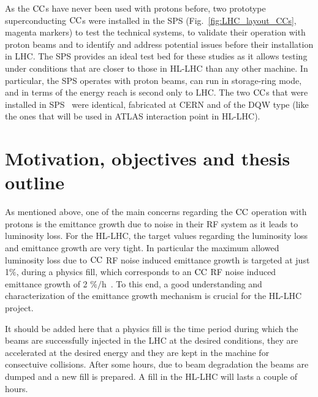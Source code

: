 
As the ${\mathrm{CC}}$s have never been used with protons before, two prototype superconducting ${\mathrm{CC}}$s were installed in the SPS (Fig.~\ref{fig:LHC_layout_CCs}, magenta markers) to test the technical systems, to validate their operation with proton beams and to identify and address potential issues before their installation in LHC. The SPS  provides an ideal test bed for these studies as it allows testing under conditions that are closer to those in HL-LHC than any other machine. In particular, the SPS operates with proton beams, can run in storage-ring mode, and in terms of the energy reach is second only to LHC. The two ${\mathrm{CC}}$s that were installed in SPS~\cite{Zanoni:2017} were identical, fabricated at CERN and of the DQW type (like the ones that will be used in ATLAS interaction point in HL-LHC).


\section{Motivation, objectives and thesis outline}\label{sec:motivation_outline}

As mentioned above, one of the main concerns regarding the ${\mathrm{CC}}$ operation with protons is the emittance growth due to noise in their RF system as it leads to luminosity loss. For the HL-LHC, the target values regarding the luminosity loss and emittance growth are very tight. In particular the maximum allowed luminosity loss due to ${\mathrm{CC}}$ RF noise induced emittance growth is targeted at just 1$\%$, during a physics fill, which corresponds to an ${\mathrm{CC}}$ RF noise induced emittance growth of 2 $\mathrm{\%/h}$~\cite{MedinaMedrano:2301928, CC_lumi_limits_philippe, CC_lumi_limits_ilias}. To this end, a good understanding and characterization of the emittance growth mechanism is crucial for the HL-LHC project.

It should be added here that a physics fill is the time period during which the beams are successfully injected in the LHC at the desired conditions, they are accelerated at the desired energy and they are kept in the machine for consectuive collisions. After some hours, due to beam degradation the beams are dumped and a new fill is prepared. A fill in the HL-LHC will lasts a couple of hours. 

